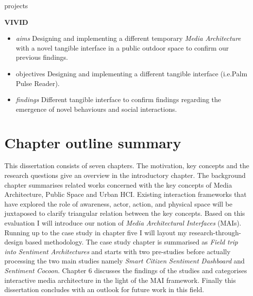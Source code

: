 \begin{singlespace}
{\begin{labeling}{projects}
\item [\textbf{VIVID}] 
\begin {itemize}
\footnotesize
\item [\textit{aims}] Designing and implementing a different temporary \textit{Media Architecture} with a novel tangible interface in a public outdoor space to confirm our previous findings.
\item [{objectives}] Designing and implementing a different tangible interface (i.e.{Palm Pulse Reader}).  
\item [\textit{findings}] Different tangible interface to confirm findings regarding the emergence of novel behaviours and social interactions. 
\end{itemize}

\end{labeling}
}
  
  \end{singlespace}


\section{Chapter outline summary}

This dissertation consists of seven chapters. The motivation, key concepts and the research questions give an overview in the introductory chapter.  The background chapter summarises related works concerned with the key concepts of Media Architecture, Public Space and Urban HCI. Existing interaction frameworks that have explored the role of awareness, actor, action, and physical space will be juxtaposed to clarify triangular relation between the key concepts. Based on this evaluation I will introduce our notion of \textit{Media Architectural Interfaces} (MAIs). Running up to the case study in chapter five I will layout my research-through-design based methodology. The case study chapter is summarised as \textit{Field trip into Sentiment Architectures} and starts with two pre-studies before actually processing the two main studies namely \textit{Smart Citizen Sentiment Dashboard} and \textit{Sentiment Cocoon}. Chapter 6 discusses the findings of the studies and categorises interactive media architecture in the light of the MAI framework. Finally this dissertation concludes with an outlook for future work in this field.  


